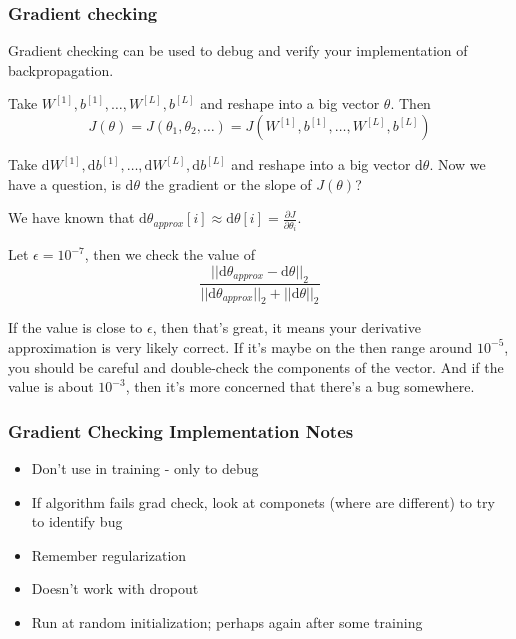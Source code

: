 \documentclass[UTF8]{article}
\newcommand{\Vector}[1]{\boldsymbol{\mathit{#1}}}   %
\newcommand{\Matrix}[1]{\boldsymbol{\mathit{#1}}}   %
\begin{document}
\subsubsection{Gradient checking}
Gradient checking can be used to debug and verify your implementation of backpropagation.

Take $\Matrix{W^{[1]}}, \Vector{b^{[1]}}, \ldots, \Matrix{W^{[L]}}, \Vector{b^{[L]}}$ and reshape
into a big vector $\Vector{\theta}$. Then
$$ J(\Vector{\theta}) = J(\Vector{\theta}_1, \Vector{\theta}_2, \ldots)
= J(\Matrix{W^{[1]}}, \Vector{b^{[1]}}, \ldots, \Matrix{W^{[L]}}, \Vector{b^{[L]}}) $$

Take $\text{d}\Matrix{W^{[1]}}, \text{d}\Vector{b^{[1]}}, \ldots, \text{d}\Matrix{W^{[L]}},
\text{d}\Vector{b^{[L]}}$ and reshape into a big vector $\text{d}\Vector{\theta}$. Now we have a
question, is $\text{d}\Vector{\theta}$ the gradient or the slope of $J(\Vector{\theta})$?

\begin{algorithm}[htb]
\For{each $i$}{
    d$\displaystyle \Vector{\theta}_{approx}[i]
    = \frac{J(\Vector{\theta}_1, \Vector{\theta}_2, \ldots, \Vector{\theta}_i + \epsilon, \ldots)
     - J(\Vector{\theta}_1, \Vector{\theta}_2, \ldots, \Vector{\theta}_i-\epsilon, \ldots)}
     {2 \epsilon}$
}
\end{algorithm}

We have known that $\displaystyle \text{d}\Vector{\theta}_{approx}[i]
\approx \text{d}\Vector{\theta}[i] = \frac{\partial J}{\partial \Vector{\theta}_i}$.

Let $\epsilon = 10^{-7}$, then we check the value of
$$ \frac{||\text{d}\Vector{\theta}_{approx} - \text{d}\Vector{\theta}||_2}
{||\text{d}\Vector{\theta}_{approx}||_2 + ||\text{d}\Vector{\theta}||_2} $$

If the value is close to $\epsilon$, then that's great, it means your derivative approximation is
very likely correct. If it's maybe on the then range around $10^{-5}$, you should be careful and
double-check the components of the vector. And if the value is about $10^{-3}$, then it's more
concerned that there's a bug somewhere.

\subsubsection{Gradient Checking Implementation Notes}
\begin{itemize}
    \item Don't use in training - only to debug
    \item If algorithm fails grad check, look at componets (where are different) to try to identify
    bug
    \item Remember regularization
    \item Doesn't work with dropout
    \item Run at random initialization; perhaps again after some training
\end{itemize}
\end{document}
